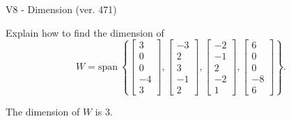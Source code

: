 \begin{exercise}
  \begin{exerciseTitle}V8 - Dimension (ver. 471)\end{exerciseTitle}
  \begin{exerciseStatement}
    Explain how to find the dimension of 
\[W=\mathrm{span}\ \left\{\left[\begin{array}{r}
3 \\
0 \\
0 \\
-4 \\
3
\end{array}\right] , \left[\begin{array}{r}
-3 \\
2 \\
3 \\
-1 \\
2
\end{array}\right] , \left[\begin{array}{r}
-2 \\
-1 \\
2 \\
-2 \\
1
\end{array}\right] , \left[\begin{array}{r}
6 \\
0 \\
0 \\
-8 \\
6
\end{array}\right]\right\}.\]



  \end{exerciseStatement}
  \begin{exerciseAnswer}
   The dimension of \(W\) is  \(3\).
  


  \end{exerciseAnswer}
\end{exercise}